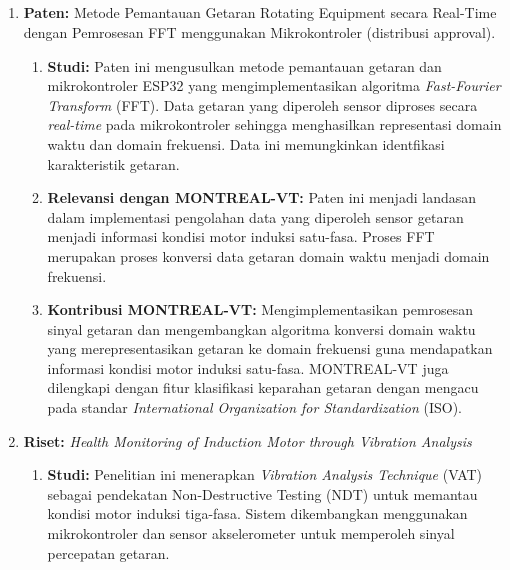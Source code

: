 \documentclass{elsinta}
\begin{document}
\subsection{\RelResearchPatentsTitle}
\begin{enumerate}
    \item \textbf{Paten:} Metode Pemantauan Getaran Rotating Equipment secara Real-Time dengan Pemrosesan FFT menggunakan Mikrokontroler (distribusi approval)\cite{2.1.10}.
    \begin{enumerate}
        \item \textbf{Studi:} Paten ini mengusulkan metode pemantauan getaran dan mikrokontroler ESP32 yang mengimplementasikan algoritma \textit{Fast-Fourier Transform} (FFT). Data getaran yang diperoleh sensor diproses secara \textit{real-time} pada mikrokontroler sehingga menghasilkan representasi domain waktu dan domain frekuensi. Data ini memungkinkan identfikasi karakteristik getaran.
        \item \textbf{Relevansi dengan  MONTREAL-VT:} Paten ini menjadi landasan dalam implementasi pengolahan data yang diperoleh sensor getaran menjadi informasi kondisi motor induksi satu-fasa. Proses FFT merupakan proses konversi data getaran domain waktu menjadi domain frekuensi.
        \item \textbf{Kontribusi  MONTREAL-VT:} Mengimplementasikan pemrosesan sinyal getaran dan mengembangkan algoritma konversi domain waktu yang merepresentasikan getaran ke domain frekuensi guna mendapatkan informasi kondisi motor induksi satu-fasa. MONTREAL-VT juga dilengkapi dengan fitur klasifikasi keparahan getaran dengan mengacu pada standar \textit{International Organization for Standardization} (ISO).
    \end{enumerate}
    \item \textbf{Riset:} \textit{Health Monitoring of Induction Motor through Vibration Analysis} \cite{1.1.17}
    \begin{enumerate}
        \item \textbf{Studi:} Penelitian ini menerapkan \textit{Vibration Analysis Technique} (VAT) sebagai pendekatan Non-Destructive Testing (NDT) untuk memantau kondisi motor induksi tiga-fasa. Sistem dikembangkan menggunakan mikrokontroler dan sensor akselerometer untuk memperoleh sinyal percepatan getaran.

\end{enumerate}
\end{enumerate}
\end{document}
